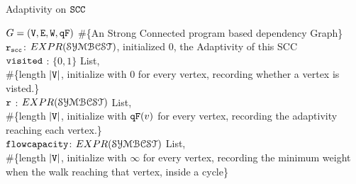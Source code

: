     \begin{algorithm}
            \caption{
            {Adaptivity on $\mathtt{SCC}$}
            \label{alg:adaptscc}
            }
            \begin{algorithmic}[1]
              \REQUIRE $G = (\mathtt{V}, \mathtt{E}, \mathtt{W}, \mathtt{qF})$ \#\{An Strong Connected program based dependency Graph\}
            \\
            $\mathtt{r_{scc}}$: $EXPR(\mathcal{SYMBCST})$, initialized $0$, the Adaptivity of this SCC
            \STATE {} 
            \\ \qquad  $\mathtt{visited}$ : $\{0, 1\}$ List, 
            \\ \qquad  \#\{length $|\mathtt{V}|$, initialize with $0$ for every vertex, recording whether a vertex is visted.\}
            \\ \qquad  $\mathtt{r}$ : $EXPR(\mathcal{SYMBCST})$ List, 
            \\ \qquad  \#\{length $|\mathtt{V}|$, initialize with $\mathtt{qF}(v)$ for every vertex, recording the adaptivity reaching each vertex.\}
            \\ \qquad  $\mathtt{flowcapacity}$: $EXPR(\mathcal{SYMBCST})$ List, 
            \\ \qquad  \#\{length $|\mathtt{V}|$, initialize with $\infty$ for every vertex,
            recording the minimum weight when the walk reaching 
            that vertex, inside a cycle\}

\end{algorithmic}
\end{algorithm}
